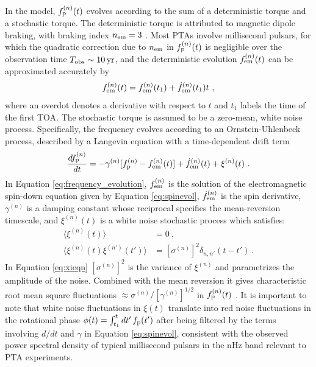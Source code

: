 \documentclass[fleqn,usenatbib,useAMS]{mnras}
\begin{document}
In the model, $f_{\rm p}^{(n)}(t)$ evolves according to the sum of a deterministic torque and a stochastic torque. The deterministic torque is attributed to magnetic dipole braking, with braking index $n_{\rm em}=3$ \citep{1969ApJ...157..869G}. Most PTAs involve millisecond pulsars, for which the quadratic correction due to $n_{\rm em}$ in $f_{\rm p}^{(n)}(t)$ is negligible over the observation time $T_{\rm obs} \sim 10 \, {\rm yr}$, and the deterministic evolution $f_{\rm em}^{(n)}(t)$ can be approximated accurately by 
\begin{equation}
 f_{\rm em}^{(n)}(t) = f_{\rm em}^{(n)}(t_1) + \dot{f}_{\rm em}^{(n)}(t_1)t \ , \label{eq:spinevol}
\end{equation} where an overdot denotes a derivative with respect to $t$ and $t_1$ labels the time of the first TOA. The stochastic torque is assumed to be a zero-mean, white noise process. Specifically, the frequency evolves according to an Ornstein-Uhlenbeck process, described by a Langevin equation with a time-dependent drift term \citep{Vargas}
\begin{equation}
	\frac{df_{\rm p}^{(n)}}{dt} = -\gamma^{(n)}	 [f_{\rm p}^{(n)} - f_{\rm em}^{(n)} (t)] + \dot{f}_{\rm em}^{(n)}(t) +\xi^{(n)}(t) \ . 
	\label{eq:frequency_evolution}
\end{equation}
In Equation \eqref{eq:frequency_evolution}, $f_{\rm em}^{(n)}$ is the solution of the electromagnetic spin-down equation given by Equation \eqref{eq:spinevol}, $\dot{f}_{\rm em}^{(n)}$ is the spin derivative, $\gamma^{(n)}$ is a damping constant whose reciprocal specifies the mean-reversion timescale, and $\xi^{(n)}(t)$ is a white noise stochastic process which satisfies:
\begin{align}
	\langle \xi^{(n)}(t) \rangle &= 0 \ , \\
	\langle \xi^{(n)}(t) \xi^{(n')}(t') \rangle &= [\sigma^{(n)}]^2 \delta_{n,n'}(t - t') \ .	\label{eq:xieqn}
\end{align}
In Equation \eqref{eq:xieqn} $[\sigma^{(n)}]^2$ is the variance of $\xi^{(n)}$ and parametrizes the amplitude of the noise. Combined with the mean reversion it gives characteristic root mean square fluctuations $\approx \sigma^{(n)} / [\gamma^{(n)}]^{1/2}$ in $f_{\rm p}^{(n)}(t)$ \citep{gardiner2009stochastic}. It is important to note that white noise fluctuations in $\xi(t)$ translate into red noise fluctuations in the rotational phase $\phi(t) = \int_{t_1}^t dt' \, f_{\rm p}(t')$ after being filtered by the terms involving $d/dt$ and $\gamma$ in Equation \eqref{eq:spinevol}, consistent with the observed power spectral density of typical millisecond pulsars in the nHz band relevant to PTA experiments. \newline 
\end{document}
